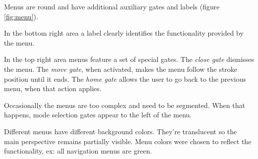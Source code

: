 Menus are round and have additional auxiliary gates and labels (figure \ref{fig:menu}).

In the bottom right area a label clearly identifies the functionality provided by the menu.

In the top right area menus feature a set of special gates.
The \emph{close gate} dismisses the menu.
The \emph{move gate}, when activated, makes the menu follow the stroke position until it ends.
The \emph{home gate} allows the user to go back to the previous menu, when that action applies.

Occasionally the menus are too complex and need to be segmented.
When that happens, mode selection gates appear to the left of the menu.

Different menus have different background colors.
They're translucent so the main perspective remains partially visible.
Menu colors were chosen to reflect the functionality, ex: all navigation menus are green.
